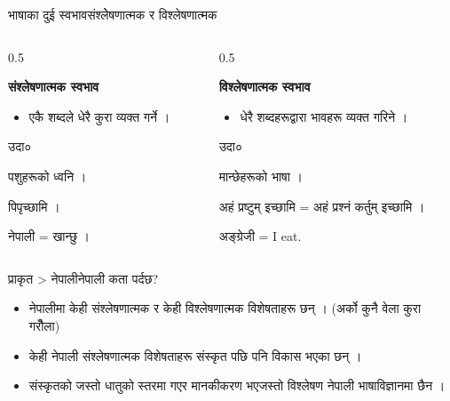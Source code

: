 \documentclass[aspectratio=169, 12pt]{beamer}
\begin{document}
\begin{frame}[fragile]{भाषाका दुई स्वभाव}{संश्लेेषणात्मक र विश्लेषणात्मक}

\begin{columns}[t]

\begin{column}{0.5\textwidth}

\textbf{संश्लेषणात्मक स्वभाव}

\begin{itemize}
\item एकै शब्दले धेरै कुरा व्यक्त गर्ने ।


\end{itemize}
\begin{alertblock}{उदा०}

पशुहरूको ध्वनि ।

पिपृच्छामि ।

नेपाली = खान्छु ।

\end{alertblock}

\end{column}

\begin{column}{0.5\textwidth}

\textbf{विश्लेषणात्मक स्वभाव}

\begin{itemize}
\item धेरै शब्दहरूद्वारा भावहरू व्यक्त गरिने ।


\end{itemize}
\begin{exampleblock}{उदा०}

मान्छेहरूको भाषा ।

अहं प्रष्टुम् इच्छामि = अहं प्रश्नं कर्तुम् इच्छामि ।

अङ्ग्रेजी = I eat.

\end{exampleblock}

\end{column}

\end{columns}

\end{frame}

\begin{frame}[fragile]{प्राकृत > नेपाली}{नेपाली कता पर्दछ?}

\begin{itemize}
\item नेपालीमा केही संश्लेषणात्मक र केही विश्लेषणात्मक विशेषताहरू छन् । (अर्को कुनै वेला कुरा गरौँला)


\item केही नेपाली संश्लेषणात्मक विशेषताहरू संस्कृत पछि पनि विकास भएका छन् ।


\item संस्कृतको जस्तो धातुको स्तरमा गएर मानकीकरण भएजस्तो विश्लेषण नेपाली भाषाविज्ञानमा छैन ।


\end{itemize}
\end{frame}
\end{document}
